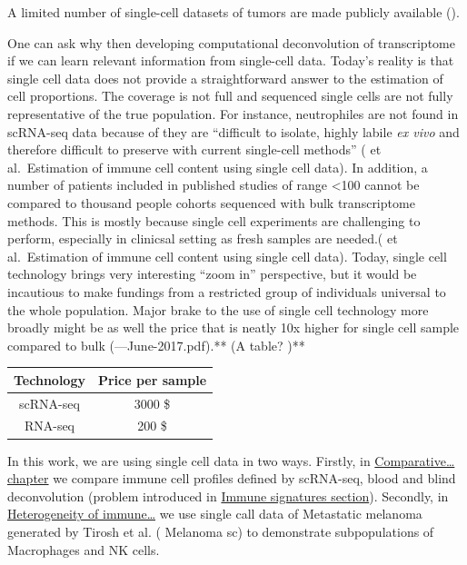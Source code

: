 \documentclass[12pt,]{book}
\theoremstyle{definition}
\theoremstyle{definition}
\theoremstyle{definition}
\theoremstyle{remark}
\begin{document}
A limited number of single-cell datasets of tumors are made publicly
available (\citet{TABLE}).

One can ask why then developing computational deconvolution of
transcriptome if we can learn relevant information from single-cell
data. Today's reality is that single cell data does not provide a
straightforward answer to the estimation of cell proportions. The
coverage is not full and sequenced single cells are not fully
representative of the true population. For instance, neutrophiles are
not found in scRNA-seq data because of they are ``difficult to isolate,
highly labile \emph{ex vivo} and therefore difficult to preserve with
current single-cell methods'' (\citet{Shelker} et al.~Estimation of
immune cell content using single cell data). In addition, a number of
patients included in published studies of range \textless{}100 cannot be
compared to thousand people cohorts sequenced with bulk transcriptome
methods. This is mostly because single cell experiments are challenging
to perform, especially in clinicsal setting as fresh samples are
needed.(\citet{Shelker} et al.~Estimation of immune cell content using
single cell data). Today, single cell technology brings very interesting
``zoom in'' perspective, but it would be incautious to make fundings
from a restricted group of individuals universal to the whole
population. Major brake to the use of single cell technology more
broadly might be as well the price that is neatly 10x higher for single
cell sample compared to bulk
(\citet{https://www.cedars-sinai.edu/Research/Research-Cores/Genomics-Core/Documents/Single-Cell-Genomics-Pricing}---June-2017.pdf).**
(A table? )**

\begin{longtable}[]{@{}cc@{}}
\toprule
Technology & Price per sample\tabularnewline
\midrule
\endhead
scRNA-seq & 3000 \$\tabularnewline
RNA-seq & 200 \$\tabularnewline
\bottomrule
\end{longtable}

In this work, we are using single cell data in two ways. Firstly, in
\protect\hyperlink{results}{Comparative\ldots{} chapter} we compare
immune cell profiles defined by scRNA-seq, blood and blind deconvolution
(problem introduced in \protect\hyperlink{immune-signatures}{Immune
signatures section}). Secondly, in \protect\hyperlink{map}{Heterogeneity
of immune\ldots{}} we use single call data of Metastatic melanoma
generated by Tirosh et al. (\citet{Tirosh} Melanoma sc) to demonstrate
subpopulations of Macrophages and NK cells.
\end{document}
